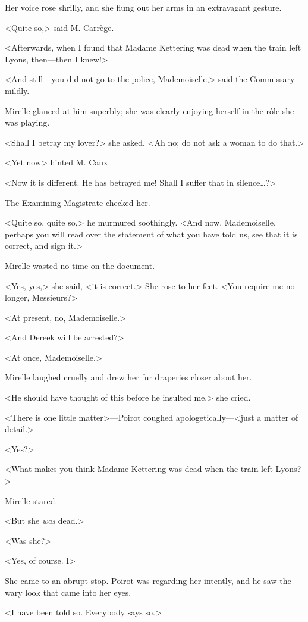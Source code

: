 Her voice rose shrilly, and she flung out her arms in an extravagant gesture.

<Quite so,> said M. Carrège.

<Afterwards, when I found that Madame Kettering was dead when the train left Lyons, then—then I knew!>

<And still—you did not go to the police, Mademoiselle,> said the Commissary mildly.

Mirelle glanced at him superbly; she was clearly enjoying herself in the rôle she was playing.

<Shall I betray my lover?> she asked. <Ah no; do not ask a woman to do that.>

<Yet now\longdash> hinted M. Caux.

<Now it is different. He has betrayed me! Shall I suffer that in silence\dots?>

The Examining Magistrate checked her.

<Quite so, quite so,> he murmured soothingly. <And now, Mademoiselle, perhaps you will read over the statement of what you have told us, see that it is correct, and sign it.>

Mirelle wasted no time on the document.

<Yes, yes,> she said, <it is correct.> She rose to her feet. <You require me no longer, Messieurs?>

<At present, no, Mademoiselle.>

<And Dereek will be arrested?>

<At once, Mademoiselle.>

Mirelle laughed cruelly and drew her fur draperies closer about her.

<He should have thought of this before he insulted me,> she cried.

<There is one little matter>—Poirot coughed apologetically—<just a matter of detail.>

<Yes?>

<What makes you think Madame Kettering was dead when the train left Lyons?>

Mirelle stared.

<But she \emph{was} dead.>

<Was she?>

<Yes, of course. I\longdash>

She came to an abrupt stop. Poirot was regarding her intently, and he saw the wary look that came into her eyes.

<I have been told so. Everybody says so.>

